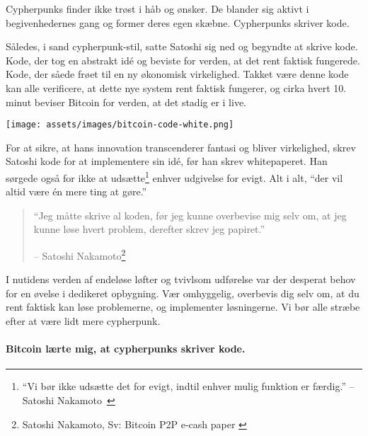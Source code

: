Cypherpunks finder ikke trøst i håb og ønsker. De blander sig aktivt
i begivenhedernes gang og former deres egen skæbne.
Cypherpunks skriver kode.

Således, i sand cypherpunk-stil, satte Satoshi sig ned og begyndte at skrive
kode. Kode, der tog en abstrakt idé og beviste for verden, at det rent 
faktisk fungerede. Kode, der såede frøet til en ny økonomisk virkelighed.
Takket være denne kode kan alle verificere, at dette nye system rent faktisk
fungerer, og cirka hvert 10. minut beviser Bitcoin for verden, at det stadig 
er i live.

\begin{center}
  \texttt{[image: assets/images/bitcoin-code-white.png]}
  \label{fig:bitcoin-code-white}
\end{center}

For at sikre, at hans innovation transcenderer fantasi og bliver virkelighed,
skrev Satoshi kode for at implementere sin idé, før han skrev whitepaperet. 
Han sørgede også for ikke at udsætte\footnote{\enquote{Vi bør ikke udsætte 
det for evigt, indtil enhver mulig funktion er færdig.} -- 
Satoshi Nakamoto~\cite{satoshi-delay}} enhver udgivelse for evigt.
Alt i alt, \enquote{der vil altid være én mere ting at gøre.}

\begin{quotation}\begin{samepage}
\enquote{Jeg måtte skrive al koden, før jeg kunne overbevise mig selv om, at jeg
kunne løse hvert problem, derefter skrev jeg papiret.}
\begin{flushright} -- Satoshi Nakamoto\footnote{Satoshi Nakamoto, Sv: 
  Bitcoin P2P e-cash paper \cite{satoshi-mail-code-first}}
\end{flushright}\end{samepage}\end{quotation}

I nutidens verden af endeløse løfter og tvivlsom udførelse var der desperat 
behov for en øvelse i dedikeret opbygning. Vær omhyggelig, overbevis
dig selv om, at du rent faktisk kan løse problemerne, og implementer
løsningerne. Vi bør alle stræbe efter at være lidt mere cypherpunk.

\paragraph{Bitcoin lærte mig, at cypherpunks skriver kode.}

%
%
%
%
